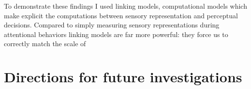 \documentclass{report}
\begin{document}
To demonstrate these findings I used linking models, computational models which make explicit the computations between sensory representation and perceptual decisions. Compared to simply measuring sensory representations during attentional behaviors linking models are far more powerful: they force us to correctly match the scale of 

\section{Directions for future investigations}






\printbibliography
\end{document}
